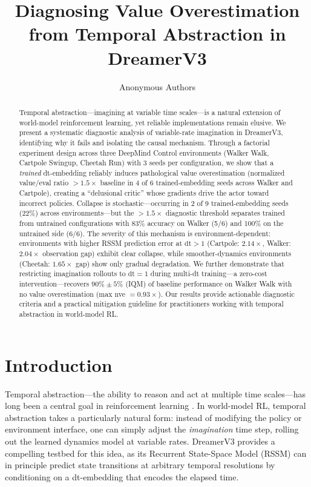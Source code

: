 \documentclass[letterpaper]{article}
\title{Diagnosing Value Overestimation from Temporal Abstraction in DreamerV3}
\author{
  Anonymous Authors
}
\date{}
\begin{document}
\maketitle

\begin{abstract}
Temporal abstraction---imagining at variable time scales---is a natural extension of world-model reinforcement learning, yet reliable implementations remain elusive.
We present a systematic diagnostic analysis of variable-rate imagination in DreamerV3, identifying why it fails and isolating the causal mechanism.
Through a factorial experiment design across three DeepMind Control environments (Walker Walk, Cartpole Swingup, Cheetah Run) with 3 seeds per configuration, we show that a \emph{trained} dt-embedding reliably induces pathological value overestimation (normalized value/eval ratio $>1.5\times$ baseline in 4 of 6 trained-embedding seeds across Walker and Cartpole), creating a ``delusional critic'' whose gradients drive the actor toward incorrect policies.
Collapse is stochastic---occurring in 2 of 9 trained-embedding seeds (22\%) across environments---but the $>1.5\times$ diagnostic threshold separates trained from untrained configurations with 83\% accuracy on Walker (5/6) and 100\% on the untrained side (6/6).
The severity of this mechanism is environment-dependent: environments with higher RSSM prediction error at $\text{dt}>1$ (Cartpole: $2.14\times$, Walker: $2.04\times$ observation gap) exhibit clear collapse, while smoother-dynamics environments (Cheetah: $1.65\times$ gap) show only gradual degradation.
We further demonstrate that restricting imagination rollouts to $\text{dt}=1$ during multi-dt training---a zero-cost intervention---recovers $90\% \pm 5\%$ (IQM) of baseline performance on Walker Walk with no value overestimation (max nve $= 0.93\times$).
Our results provide actionable diagnostic criteria and a practical mitigation guideline for practitioners working with temporal abstraction in world-model RL.
\end{abstract}

\section{Introduction}
\label{sec:intro}

Temporal abstraction---the ability to reason and act at multiple time scales---has long been a central goal in reinforcement learning \citep{sutton1999options,precup2000temporal}.
In world-model RL, temporal abstraction takes a particularly natural form: instead of modifying the policy or environment interface, one can simply adjust the \emph{imagination} time step, rolling out the learned dynamics model at variable rates.
DreamerV3 \citep{hafner2023dreamerv3} provides a compelling testbed for this idea, as its Recurrent State-Space Model (RSSM) can in principle predict state transitions at arbitrary temporal resolutions by conditioning on a dt-embedding that encodes the elapsed time.
\end{document}
